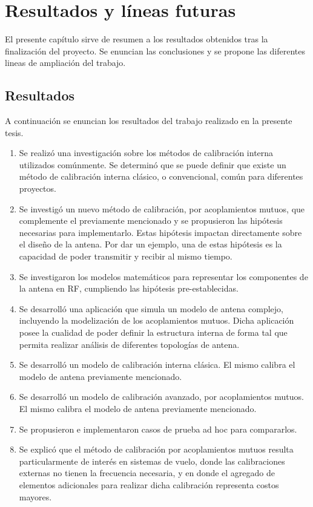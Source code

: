 \chapter{Resultados y líneas futuras}

El presente capítulo sirve de resumen a los resultados obtenidos tras la finalización del proyecto. Se enuncian las 
conclusiones y se propone las diferentes lineas de ampliación del trabajo.

\section{Resultados}

A continuación se enuncian los resultados del trabajo realizado en la presente tesis. 
\begin{enumerate}
	\item Se realizó una investigación sobre los métodos de calibración interna utilizados comúnmente. Se determinó que se puede
		definir que existe un método de calibración interna clásico, o convencional, común para diferentes proyectos.
	\item Se investigó un nuevo método de calibración, por acoplamientos mutuos, que complemente el previamente mencionado y se
		propusieron las hipótesis necesarias para implementarlo. Estas hipótesis impactan directamente sobre el diseño de la
		antena. Por dar un ejemplo, una de estas hipótesis es la capacidad de poder transmitir y recibir al mismo tiempo.
	\item Se investigaron los modelos matemáticos para representar los componentes de la antena en RF, cumpliendo las hipótesis
		pre-establecidas.
	\item Se desarrolló una aplicación que simula un modelo de antena complejo, incluyendo la modelización de los acoplamientos
		mutuos. Dicha aplicación posee la cualidad de poder definir la estructura interna de forma tal que permita realizar 
		análisis de diferentes topologías de antena.
	\item Se desarrolló un modelo de calibración interna clásica. El mismo calibra el modelo de antena previamente mencionado.
	\item Se desarrolló un modelo de calibración avanzado, por acoplamientos mutuos. El mismo calibra el modelo de antena
		previamente mencionado. 
	\item Se propusieron e implementaron casos de prueba ad hoc para compararlos.
	\item Se explicó que el método de calibración por acoplamientos mutuos resulta particularmente de interés en sistemas de
		vuelo, donde las calibraciones externas no tienen la frecuencia necesaria, y en donde el agregado de elementos
	adicionales para realizar dicha calibración representa costos mayores.
\end{enumerate}

